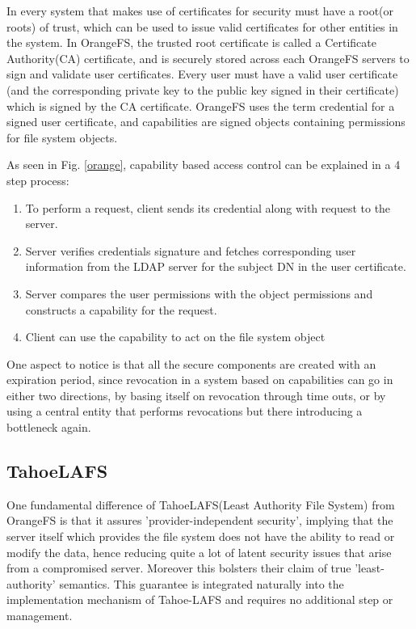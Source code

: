 In every system that makes use of certificates for security must have a root(or roots) of trust, which can be used to issue valid certificates for other entities in the system. In OrangeFS, the trusted root certificate is called a Certificate Authority(CA) certificate, and is securely stored across each OrangeFS servers to sign and validate user certificates. Every user must have a valid user certificate (and the corresponding private key to the public key signed in their certificate) which is signed by the CA certificate. OrangeFS uses the term credential for a signed user certificate, and capabilities are signed objects containing permissions for file system objects.

As seen in Fig. \ref{orange}, capability based access control can be explained in a 4 step process:
\begin{enumerate}
\item To perform a request, client sends its credential along with request to the server.
\item Server verifies credentials signature and fetches corresponding user information from the LDAP server for the subject DN in the user certificate. 
\item Server compares the user permissions with the object permissions and constructs a capability for the request.
\item Client can use the capability to act on the file system object
\end{enumerate}
One aspect to notice is that all the secure components are created with an expiration period, since revocation in a system based on capabilities can go in either two directions, by basing itself on revocation through time outs, or by using a central entity that performs revocations but there introducing a bottleneck again.

\subsection{TahoeLAFS}
One fundamental difference of TahoeLAFS(Least Authority File System) from OrangeFS is that it assures 'provider-independent security', implying that the server itself which provides the file system does not have the ability to read or modify the data, hence reducing quite a lot of latent security issues that arise from a compromised server. Moreover this bolsters their claim of true 'least-authority' semantics. This guarantee is integrated naturally into the implementation mechanism of Tahoe-LAFS and requires no additional step or management. 

